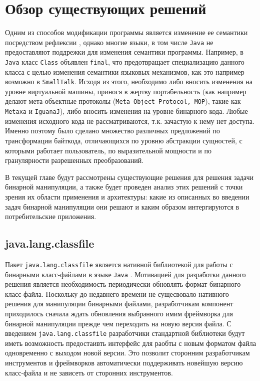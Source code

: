 \section{Обзор существующих решений}
\label{sec:Chapter2} 

Одним из способов модификации программы является изменение ее семантики посредством рефлексии \cite{compReflection}, однако многие языки, в том числе \texttt{Java} не предоставляют поддрежки для изменения семантики программы. Например, в \texttt{Java} класс \texttt{Class} объявлен \texttt{final}, что предотвращает специализацию данного класса с целью изменения семантики языковых механизмов, как это например возможно в \texttt{SmallTalk}. Исходя из этого, необходимо либо вносить изменения на уровне виртуальной машины, принося в жертву портабельность (как например делают мета-объектные протоколы (\texttt{Meta~Object~Protocol,~MOP}), такие как \texttt{Metaxa} и \texttt{IguanaJ}), либо вносить изменения на уровне бинарного кода. Любые изменения исходного кода не рассматриваются, т.к. зачастую к нему нет доступа. Именно поэтому было сделано множество различных предложений по трансформации байткода, отличающихся по уровню абстракции сущностей, с которыми работает пользователь, по выразительной мощности и по гранулярности разрешенных преобразований.

В текущей главе будут рассмотрены существующие решения для решения задачи бинарной манипуляции, а также будет проведен анализ этих решений с точки зрения их области применения и архитектуры: какие из описанных во введении задач бинарной манипуляции они решают и каким образом интергируются в потребительские приложения.

\subsection{java.lang.classfile}

Пакет \texttt{java.lang.classfile} является нативной библиотекой для работы с бинарными класс-файлами в языке \texttt{Java} \cite{lavaLangClassfile}. Мотивацией для разработки данного решения является необходимость периодически обновлять формат бинарного класс-файла. Поскольку до недавнего времени не сущесвовало нативного решения для манипуляции бинарными файлами, разработчикам компонент приходилось сначала ждать обновления выбранного имим фреймворка для бинарной манипуляции прежде чем переходить на новую версия файла. С введением \texttt{java.lang.classfile} разработчики стандартной библиотеки будут иметь возможность предостаивть интерфейс для раобты с новым форматом файла одновременно с выходом новой версии. Это позволит сторонним разработчикам инструментов и фреймворков автоматически поддерживать новейшую версию класс-файла и не зависеть от сторонних инструментов.

